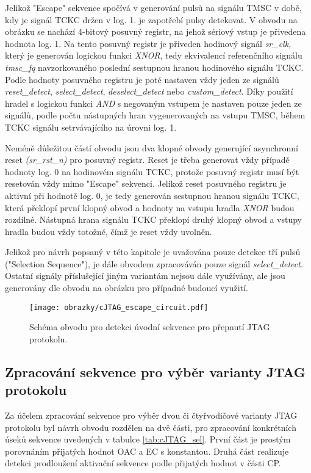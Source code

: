 Jelikož "Escape" sekvence spočívá v generování pulsů na signálu TMSC v době, kdy je signál TCKC držen v log. 1. je zapotřebí pulsy detekovat. V obvodu na obrázku se nachází 4-bitový posuvný registr, na jehož sériový vstup je přivedena hodnota log. 1. Na tento posuvný registr je přiveden hodinový signál \textit{sr\_clk}, který je generován logickou funkci \textit{XNOR}, tedy ekvivalencí referenčního signálu \textit{tmsc\_fq} navzorkovaného poslední sestupnou hranou hodinového signálu TCKC. Podle hodnoty posuvného registru je poté nastaven vždy jeden ze signálů \textit{reset\_detect}, \textit{select\_detect}, \textit{deselect\_detect} nebo \textit{custom\_detect}. Díky použití hradel s logickou funkci \textit{AND} s negovaným vstupem je nastaven pouze jeden ze signálů, podle počtu nástupných hran vygenerovaných na vstupu TMSC, během TCKC signálu setrvávajícího na úrovni log. 1. 

Neméně důležitou částí obvodu jsou dva klopné obvody generující asynchronní reset \textit{(sr\_rst\_n)} pro posuvný registr. Reset je třeba generovat vždy případě hodnoty log. 0 na hodinovém signálu TCKC, protože posuvný registr musí být resetován vždy mimo "Escape" sekvenci. Jelikož reset posuvného registru je aktivní při hodnotě log. 0, je tedy generován sestupnou hranou signálu TCKC, která překlopí první klopný obvod a hodnoty na vstupu hradla \textit{XNOR} budou rozdílné. Nástupná hrana signálu TCKC překlopí druhý klopný obvod a vstupy hradla budou vždy totožné, čímž je reset vždy uvolněn.

Jelikož pro návrh popsaný v této kapitole je uvažována pouze detekce tří pulsů ("Selection Sequence"), je dále obvodem zpracováván pouze signál \textit{select\_detect}. Ostatní signály příslušející jiným variantám nejsou dále využívány, ale jsou generovány dle obvodu na obrázku pro případné budoucí využití.

\begin{figure}[!h]
  \begin{center}
    \texttt{[image: obrazky/cJTAG\_escape\_circuit.pdf]}
  \end{center}
  \caption{Schéma obvodu pro detekci úvodní sekvence pro přepnutí JTAG protokolu.}
	\label{fig:cJTAG_escape_circuit}
\end{figure}

\subsection{Zpracování sekvence pro výběr varianty JTAG protokolu}	\label{subsec:sel_seq_det}
Za účelem zpracování sekvence pro výběr dvou či čtyřvodičové varianty \acs{JTAG} protokolu byl návrh obvodu rozdělen na dvě části, pro zpracování konkrétních úseků sekvence uvedených v tabulce \ref{tab:cJTAG_sel}. První část je prostým porovnáním přijatých hodnot \acs{OAC} a \acs{EC} s konstantou. Druhá část realizuje detekci prodloužení aktivační sekvence podle přijatých hodnot v části \acs{CP}.

